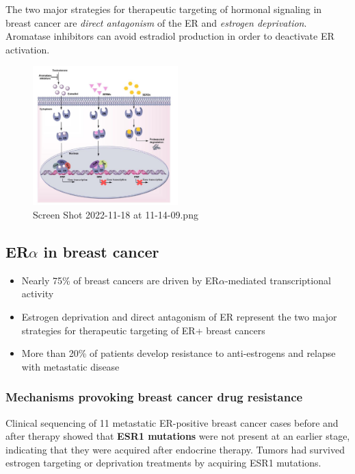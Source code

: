 The two major strategies for therapeutic targeting of hormonal signaling in breast cancer are \emph{direct antagonism} of the ER and \emph{estrogen deprivation}. Aromatase inhibitors can avoid estradiol production in order to deactivate ER activation.

\begin{figure}
\centering
\includegraphics[width=0.5\textwidth]{../_resources/Screen_Shot_2022-11-18_at_11-14-09.png}
\caption{Screen Shot 2022-11-18 at 11-14-09.png}
\end{figure}


\subsection{ER$\alpha$ in breast cancer}

\begin{itemize}
\tightlist
\item
  Nearly 75\% of breast cancers are driven by ER$\alpha$-mediated transcriptional activity
\item
  Estrogen deprivation and direct antagonism of ER represent the two major strategies for therapeutic targeting of ER+ breast cancers
\item
  More than 20\% of patients develop resistance to anti-estrogens and relapse with metastatic disease
\end{itemize}

\hypertarget{mechanisms-provoking-breast-cancer-drug-resistance}{%
\subsubsection{Mechanisms provoking breast cancer drug resistance}\label{mechanisms-provoking-breast-cancer-drug-resistance}}

Clinical sequencing of 11 metastatic ER-positive breast cancer cases before and after therapy showed that \textbf{ESR1 mutations} were not present at an earlier stage, indicating that they were acquired after endocrine therapy. Tumors had survived estrogen targeting or deprivation treatments by acquiring ESR1 mutations.

